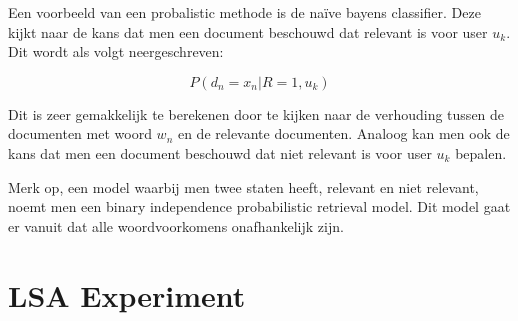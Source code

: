 Een voorbeeld van een probalistic methode is de na\"ive bayens classifier. Deze kijkt naar de kans dat men een document beschouwd dat relevant is voor user $u_{k}$. Dit wordt als volgt neergeschreven:

\[ P(d_{n}=x_{n}|R=1,u_{k}) \]

Dit is zeer gemakkelijk te berekenen door te kijken naar de verhouding tussen de documenten met woord $w_{n}$ en de relevante documenten. Analoog kan men ook de kans dat men een document beschouwd dat niet relevant is voor user $u_{k}$ bepalen.

Merk op, een model waarbij men twee staten heeft, relevant en niet relevant, noemt men een binary independence probabilistic retrieval model. Dit model gaat er vanuit dat alle woordvoorkomens onafhankelijk zijn.


\section{LSA Experiment}\label{LSA Experiment}

